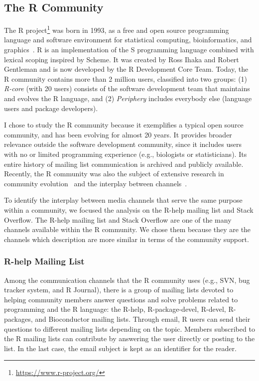 \documentclass{sig-alternate-05-2015}
\begin{document}
\subsection{The R Community}

	The R project\footnote{\url{https://www.r-project.org/}} was born in 1993, as a free and open source programming language and software environment for statistical computing, bioinformatics, and graphics~\cite{Ihaka1996}. 
	R is an implementation of the S programming language combined with lexical scoping inspired by Scheme. 
	It was created by Ross Ihaka and Robert Gentleman and is now developed by the R Development Core Team.
	Today, the R community contains more than 2 million users, classified into two groups: (1) \textit{R-core} (with 20 users) consists of the software development team that maintains and evolves the R language, and (2) \textit{Periphery} includes everybody else (language users and package developers).

	I chose to study the R community because it exemplifies a typical open source community, and has been evolving for almost 20 years. 
	It provides broader relevance outside the software development community, since it includes users with no or limited programming experience (e.g., biologists or statisticians). 
	Its entire history of mailing list communication is archived and publicly available.
	Recently, the R community was also the subject of extensive research in community evolution~\cite{German2013} and the interplay between channels~\cite{Vasilescu2014c}. 

	To identify the interplay between media channels that serve the same purpose within a community, we focused the analysis on the R-help mailing list and Stack Overflow.
	The R-help mailing list and Stack Overflow are one of the many channels available within the R community.
	We chose them because they are the channels which description are more similar in terms of the community support.

\subsubsection{R-help Mailing List}

	Among the communication channels that the R community uses (e.g., SVN, bug tracker system, and R Journal), there is a group of mailing lists devoted to helping community members answer questions and solve problems related to programming and the R language: the R-help, R-package-devel, R-devel, R-packages, and Bioconductor mailing lists.
	Through email, R users can send their questions to different mailing lists depending on the topic.
	Members subscribed to the R mailing lists can contribute by answering the user directly or posting to the list.
	In the last case, the email subject is kept as an identifier for the reader.
\end{document}
